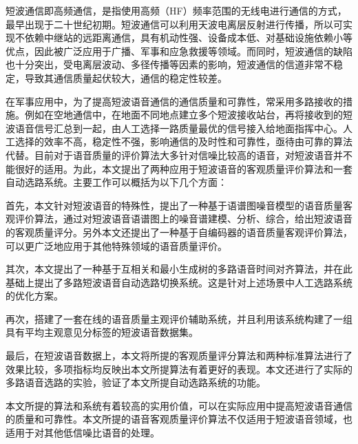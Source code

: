 \begin{cabstract}

  短波通信即高频通信，是指使用高频（HF）频率范围的无线电进行通信的方式，最早出现于二十世纪初期。短波通信可以利用天波电离层反射进行传播，所以可实现不依赖中继站的远距离通信，具有机动性强、设备成本低、对基础设施依赖小等优点，因此被广泛应用于广播、军事和应急救援等领域。而同时，短波通信的缺陷也十分突出，受电离层波动、多径传播等因素的影响，短波通信的信道非常不稳定，导致其通信质量起伏较大，通信的稳定性较差。
  
  在军事应用中，为了提高短波语音通信的通信质量和可靠性，常采用多路接收的措施。例如在空地通信中，在地面不同地点建立多个短波接收站台，再将接收到的短波语音信号汇总到一起，由人工选择一路质量最优的信号接入给地面指挥中心。人工选择的效率不高，稳定性不强，影响通信的及时性和可靠性，亟待由可靠的算法代替。目前对于语音质量的评价算法大多针对信噪比较高的语音，对短波语音并不能很好的适用。为此，本文提出了两种应用于短波语音的客观质量评价算法和一套自动选路系统。主要工作可以概括为以下几个方面：

  首先，本文针对短波语音的特殊性，提出了一种基于语谱图噪音模型的语音质量客观评价算法，通过对短波语音语谱图上的噪音谱建模、分析、综合，给出短波语音的客观质量评分。另外本文还提出了一种基于自编码器的语音质量客观评价算法，可以更广泛地应用于其他特殊领域的语音质量评价。

  其次，本文提出了一种基于互相关和最小生成树的多路语音时间对齐算法，并在此基础上提出了多路短波语音自动选路切换系统。这是针对上述场景中人工选路系统的优化方案。

  再次，搭建了一套在线的语音质量主观评价辅助系统，并且利用该系统构建了一组具有平均主观意见分标签的短波语音数据集。

  最后，在短波语音数据上，本文将所提的客观质量评分算法和两种标准算法进行了效果比较，多项指标均反映出本文所提算法有着更好的表现。本文还进行了实际的多路语音选路的实验，验证了本文所提自动选路系统的功能。

  本文所提的算法和系统有着较高的实用价值，可以在实际应用中提高短波语音通信的质量和可靠性。本文所提的语音客观质量评价算法不仅适用于短波语音领域，也适用于对其他低信噪比语音的处理。

\end{cabstract}


